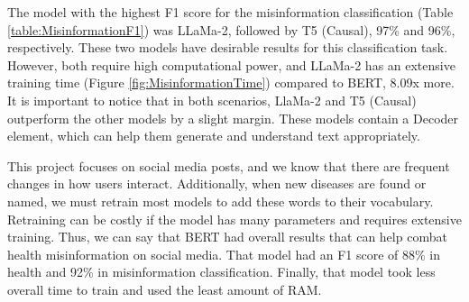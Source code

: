 The model with the highest F1 score for the misinformation classification (Table \ref{table:MisinformationF1}) was LLaMa-2, followed by T5 (Causal), 97\% and 96\%, respectively. These two models
have desirable results for this classification task. However, both require high computational power, and LLaMa-2 has an extensive training time (Figure \ref{fig:MisinformationTime}) compared to BERT,
8.09x more. It is important to notice that in both scenarios, LlaMa-2 and T5 (Causal) outperform the other models by a slight margin. These models contain a Decoder element, which can help them
generate and understand text appropriately.

This project focuses on social media posts, and we know that there are frequent changes in how users interact. Additionally, when new diseases are found or named, we must retrain most
models to add these words to their vocabulary. Retraining can be costly if the model has many parameters and requires extensive training. Thus, we can say that BERT had overall results
that can help combat health misinformation on social media. That model had an F1 score of 88\% in health and 92\% in misinformation classification. Finally, that model took less overall time
to train and used the least amount of RAM.











